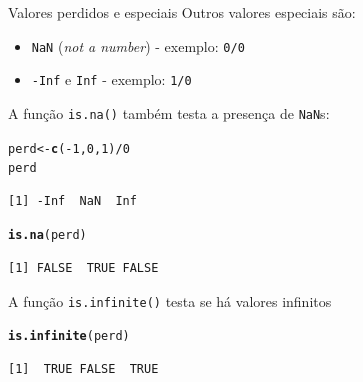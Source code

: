 \documentclass[10pt,handout]{beamer}\usepackage[]{graphicx}\usepackage[]{color}
\makeatletter
\newcommand{\hlnum}[1]{\textcolor[rgb]{0.686,0.059,0.569}{#1}}%
\newcommand{\hlopt}[1]{\textcolor[rgb]{0,0,0}{#1}}%
\newcommand{\hlstd}[1]{\textcolor[rgb]{0.345,0.345,0.345}{#1}}%
\newcommand{\hlkwb}[1]{\textcolor[rgb]{0.69,0.353,0.396}{#1}}%
\newcommand{\hlkwd}[1]{\textcolor[rgb]{0.737,0.353,0.396}{\textbf{#1}}}%
\newenvironment{kframe}{%
 \def\at@end@of@kframe{}%
 \ifinner\ifhmode%
  \def\at@end@of@kframe{\end{minipage}}%
  \begin{minipage}{\columnwidth}%
 \fi\fi%
 \def\FrameCommand##1{\hskip\@totalleftmargin \hskip-\fboxsep
 \colorbox{shadecolor}{##1}\hskip-\fboxsep
     \hskip-\linewidth \hskip-\@totalleftmargin \hskip\columnwidth}%
 \MakeFramed {\advance\hsize-\width
   \@totalleftmargin\z@ \linewidth\hsize
   \@setminipage}}%
 {\par\unskip\endMakeFramed%
 \at@end@of@kframe}
\newenvironment{knitrout}{}{} %
\makeatother
\begin{document}
\begin{frame}[fragile]{Valores perdidos e especiais}
Outros valores especiais são:
\begin{itemize}
\item \texttt{NaN} (\textit{not a number}) - exemplo: \texttt{0/0}
\item \texttt{-Inf} e \texttt{Inf} - exemplo: \texttt{1/0}
\end{itemize}
A função \texttt{is.na()} também testa a presença de \texttt{NaN}s:
\begin{knitrout}\small
{}\color{fgcolor}\begin{kframe}
\begin{alltt}
\hlstd{perd} \hlkwb{<-} \hlkwd{c}\hlstd{(}\hlopt{-}\hlnum{1}\hlstd{,}\hlnum{0}\hlstd{,}\hlnum{1}\hlstd{)}\hlopt{/}\hlnum{0}
\hlstd{perd}
\end{alltt}
\begin{verbatim}
[1] -Inf  NaN  Inf
\end{verbatim}
\begin{alltt}
\hlkwd{is.na}\hlstd{(perd)}
\end{alltt}
\begin{verbatim}
[1] FALSE  TRUE FALSE
\end{verbatim}
\end{kframe}
\end{knitrout}
A função \verb|is.infinite()| testa se há valores infinitos
\begin{knitrout}\small
{}\color{fgcolor}\begin{kframe}
\begin{alltt}
\hlkwd{is.infinite}\hlstd{(perd)}
\end{alltt}
\begin{verbatim}
[1]  TRUE FALSE  TRUE
\end{verbatim}
\end{kframe}
\end{knitrout}
\end{frame}
\end{document}

